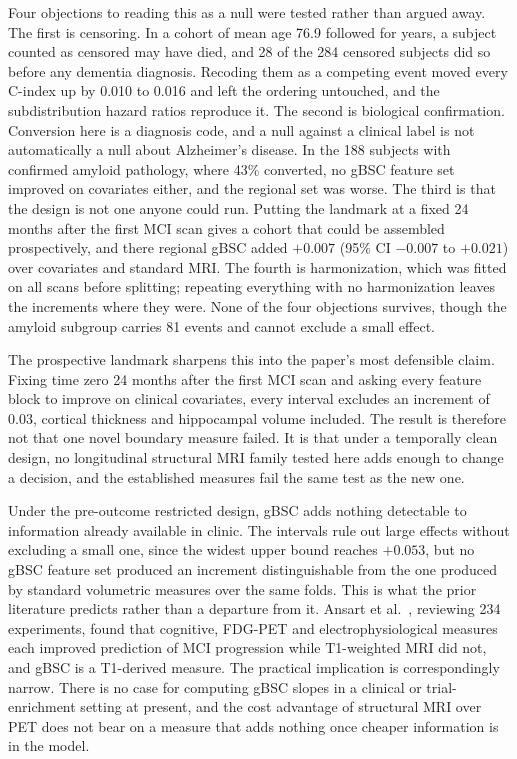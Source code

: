 \documentclass[blue]{ludusofficial}  %
\begin{document}
Four objections to reading this as a null were tested rather than argued away. The first is censoring. In a cohort of mean age 76.9 followed for years, a subject counted as censored may have died, and 28 of the 284 censored subjects did so before any dementia diagnosis. Recoding them as a competing event moved every C-index up by 0.010 to 0.016 and left the ordering untouched, and the subdistribution hazard ratios reproduce it. The second is biological confirmation. Conversion here is a diagnosis code, and a null against a clinical label is not automatically a null about Alzheimer's disease. In the 188 subjects with confirmed amyloid pathology, where 43\% converted, no gBSC feature set improved on covariates either, and the regional set was worse. The third is that the design is not one anyone could run. Putting the landmark at a fixed 24 months after the first MCI scan gives a cohort that could be assembled prospectively, and there regional gBSC added $+0.007$ (95\% CI $-0.007$ to $+0.021$) over covariates and standard MRI. The fourth is harmonization, which was fitted on all scans before splitting; repeating everything with no harmonization leaves the increments where they were. None of the four objections survives, though the amyloid subgroup carries 81 events and cannot exclude a small effect.

The prospective landmark sharpens this into the paper's most defensible claim. Fixing time zero 24 months after the first MCI scan and asking every feature block to improve on clinical covariates, every interval excludes an increment of 0.03, cortical thickness and hippocampal volume included. The result is therefore not that one novel boundary measure failed. It is that under a temporally clean design, no longitudinal structural MRI family tested here adds enough to change a decision, and the established measures fail the same test as the new one.

Under the pre-outcome restricted design, gBSC adds nothing detectable to information already available in clinic. The intervals rule out large effects without excluding a small one, since the widest upper bound reaches $+0.053$, but no gBSC feature set produced an increment distinguishable from the one produced by standard volumetric measures over the same folds. This is what the prior literature predicts rather than a departure from it. Ansart et al.~\cite{ansart2021predicting}, reviewing 234 experiments, found that cognitive, FDG-PET and electrophysiological measures each improved prediction of MCI progression while T1-weighted MRI did not, and gBSC is a T1-derived measure. The practical implication is correspondingly narrow. There is no case for computing gBSC slopes in a clinical or trial-enrichment setting at present, and the cost advantage of structural MRI over PET does not bear on a measure that adds nothing once cheaper information is in the model.
\end{document}

